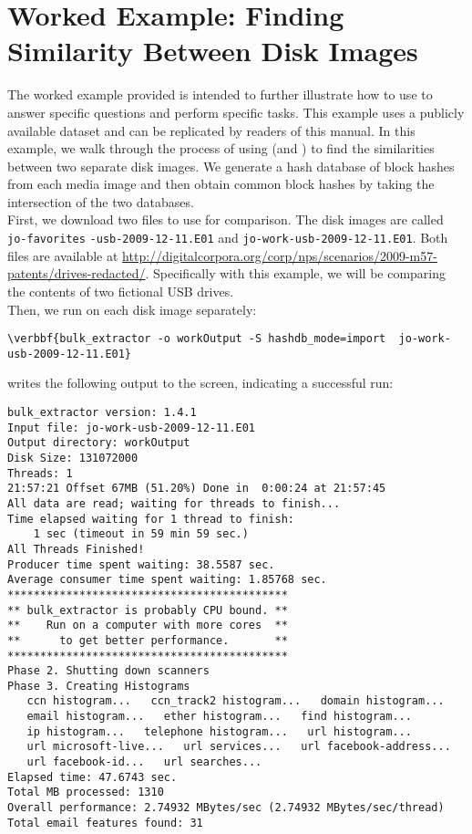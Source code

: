 
\section{Worked Example: Finding Similarity Between Disk Images}
The worked example provided is intended to further illustrate how to use \hdb to answer specific questions and perform specific tasks.  This example uses a publicly available dataset and can be replicated by readers of this manual.  In this example, we walk through the process of using \hdb (and \bulk) to find the similarities between two separate disk images. We generate a hash database of block hashes from each media image and then obtain common block hashes by taking the intersection of the two databases.\\

First, we download two files to use for comparison. The disk images are called \texttt{jo-favorites} \texttt{-usb-2009-12-11.E01} and \texttt{jo-work-usb-2009-12-11.E01}. Both files are available at \url{http://digitalcorpora.org/corp/nps/scenarios/2009-m57-patents/drives-redacted/}. Specifically with this example, we will be comparing the contents of two fictional USB drives.\\

Then, we run \bulk on each disk image separately:
\begin{Verbatim}[commandchars=\\\{\}]
\verbbf{bulk_extractor -o workOutput -S hashdb_mode=import  jo-work-usb-2009-12-11.E01}
\end{Verbatim}

\bulk writes the following output to the screen, indicating a successful run:
\begingroup
\footnotesize
\begin{Verbatim}[fontfamily=courier]
bulk_extractor version: 1.4.1
Input file: jo-work-usb-2009-12-11.E01
Output directory: workOutput
Disk Size: 131072000
Threads: 1
21:57:21 Offset 67MB (51.20%) Done in  0:00:24 at 21:57:45
All data are read; waiting for threads to finish...
Time elapsed waiting for 1 thread to finish:
    1 sec (timeout in 59 min 59 sec.)
All Threads Finished!
Producer time spent waiting: 38.5587 sec.
Average consumer time spent waiting: 1.85768 sec.
*******************************************
** bulk_extractor is probably CPU bound. **
**    Run on a computer with more cores  **
**      to get better performance.       **
*******************************************
Phase 2. Shutting down scanners
Phase 3. Creating Histograms
   ccn histogram...   ccn_track2 histogram...   domain histogram...
   email histogram...   ether histogram...   find histogram...
   ip histogram...   telephone histogram...   url histogram...
   url microsoft-live...   url services...   url facebook-address...
   url facebook-id...   url searches...
Elapsed time: 47.6743 sec.
Total MB processed: 1310
Overall performance: 2.74932 MBytes/sec (2.74932 MBytes/sec/thread)
Total email features found: 31
\end{Verbatim}
\endgroup


